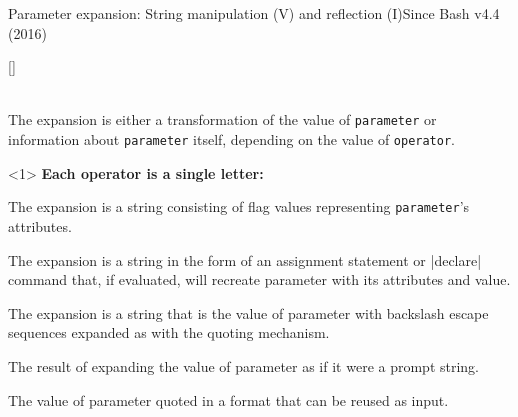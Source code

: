 \begin{frame}[fragile]{Parameter expansion: String manipulation (V) and reflection (I)}{Since Bash v4.4 (2016)}
    \vspace{-2mm}
    \begin{varblock*}{}[\textwidth]{}
        \begin{description}[Syntax:]
            \item[Syntax:] \\
            {\small
                The expansion is either a transformation of the value of \texttt{parameter} or information about \texttt{parameter} itself, depending on the value of \texttt{operator}.\\
            }
        \end{description}
    \end{varblock*}
    \vspace{3mm}
    \begin{overlayarea}{\textwidth}{0.5\textheight}
        \begin{onlyenv}<1>
            \textbf{Each operator is a single letter:}
            \begin{description}[X:]
                \item[a]
                {\small
                    The expansion is a string consisting of flag values representing \texttt{parameter}’s attributes.
                }
                \item[A]
                {\small
                    The expansion is a string in the form of an assignment statement or \bash|declare| command that, if evaluated, will recreate parameter with its attributes and value.
                }
                \item[E]
                {\small
                    The expansion is a string that is the value of parameter with backslash escape sequences expanded as with the \texttt{} quoting mechanism.
                }
                \item[P]
                {\small
                    The result of expanding the value of parameter as if it were a prompt string.
                }
                \item[Q]
                {\small
                    The value of parameter quoted in a format that can be reused as input.
                }
            \end{description}

\end{onlyenv}
\end{overlayarea}
\end{frame}
